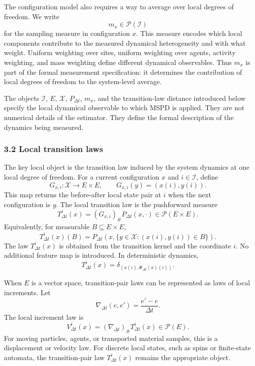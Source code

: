 The configuration model also requires a way to average over local degrees of freedom.  We write
\[
  m_x\in\mathcal P(\mathcal I)
\]
for the sampling measure in configuration \(x\).  This measure encodes which local components contribute to the measured dynamical heterogeneity and with what weight.  Uniform weighting over sites, uniform weighting over agents, activity weighting, and mass weighting define different dynamical observables.  Thus \(m_x\) is part of the formal measurement specification: it determines the contribution of local degrees of freedom to the system-level average.

The objects \(\mathcal I\), \(E\), \(\mathcal X\), \(P_{\Delta t}\), \(m_x\), and the transition-law distance introduced below specify the local dynamical observable to which MSPD is applied.  They are not numerical details of the estimator.  They define the formal description of the dynamics being measured.

\subsubsection*{3.2 Local transition laws}
\label{method:local-transition-laws}

The key local object is the transition law induced by the system dynamics at one local degree of freedom.  For a current configuration \(x\) and \(i\in\mathcal I\), define
\[
  G_{x,i}:\mathcal X\to E\times E,
  \qquad
  G_{x,i}(y)=(x(i),y(i)).
\]
This map returns the before-after local state pair at \(i\) when the next configuration is \(y\).  The local transition law is the pushforward measure
\begin{equation}
T_{\Delta t}^{i}(x)
  =
  (G_{x,i})_{\#}P_{\Delta t}(x,\cdot)
  \in\mathcal P(E\times E).
  \label{eq:local-transition-law}
\end{equation}
Equivalently, for measurable \(B\subseteq E\times E\),
\[
  T_{\Delta t}^{i}(x)(B)
  =
  P_{\Delta t}\left(x,
  \{y\in\mathcal X:(x(i),y(i))\in B\}
  \right).
\]
The law \(T_{\Delta t}^{i}(x)\) is obtained from the transition kernel and the coordinate \(i\).  No additional feature map is introduced.  In deterministic dynamics,
\[
  T_{\Delta t}^{i}(x)
  =
  \delta_{(x(i),\Phi_{\Delta t}(x)(i))}.
\]

When \(E\) is a vector space, transition-pair laws can be represented as laws of local increments.  Let
\[
  \nabla_{\Delta t}(e,e')=\frac{e'-e}{\Delta t}.
\]
The local increment law is
\begin{equation}
V_{\Delta t}^{i}(x)
  =
  (\nabla_{\Delta t})_{\#}T_{\Delta t}^{i}(x)
  \in\mathcal P(E).
  \label{eq:local-increment-law}
\end{equation}
For moving particles, agents, or transported material samples, this is a displacement or velocity law.  For discrete local states, such as spins or finite-state automata, the transition-pair law \(T_{\Delta t}^{i}(x)\) remains the appropriate object.

